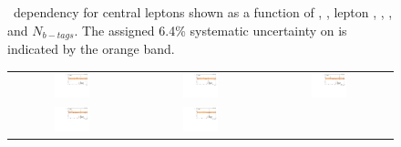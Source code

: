 \begin{figure}[htb]
\begin{center}
\begin{tabular}{ccc}
    \end{tabular}
    \caption{
      \label{fig:EffDependencyBarrel}
      \rt\ dependency for central leptons shown as a function of \nj, \nvtx, lepton \pt, \mll, \MET, and $N_{b-tags}$.
      The assigned 6.4\% systematic uncertainty on \rt is indicated by the orange band.
    }
  \end{center}
\end{figure}

\begin{figure}[htb]
  \begin{center}
    \begin{tabular}{ccc}
      \includegraphics[width=0.30\textwidth]{bkgd/figs/Triggereff_SFvsOF_Syst_PFHT_HighHTExclusiveForward_Run2015_25ns_NJets_None_NonIso_MC.pdf} &
      \includegraphics[width=0.30\textwidth]{bkgd/figs/Triggereff_SFvsOF_Syst_PFHT_HighHTExclusiveForward_Run2015_25ns_nVtx_None_NonIso_MC.pdf}  &
      \includegraphics[width=0.30\textwidth]{bkgd/figs/Triggereff_SFvsOF_Syst_PFHT_HighHTExclusiveForward_Run2015_25ns_TrailingPt_None_NonIso_MC.pdf} \\
      \includegraphics[width=0.30\textwidth]{bkgd/figs/Triggereff_SFvsOF_Syst_PFHT_HighHTExclusiveForward_Run2015_25ns_Mll_None_NonIso_MC.pdf} &
      \includegraphics[width=0.30\textwidth]{bkgd/figs/Triggereff_SFvsOF_Syst_PFHT_HighHTExclusiveForward_Run2015_25ns_MET_None_NonIso_MC.pdf} &

\end{tabular}
\end{center}
\end{figure}
